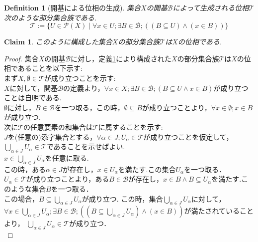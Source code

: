 \documentclass[dvipdfmx]{jbook}
\newtheorem{definition}{Definition}[section]
\newtheorem{claim}{Claim}[section]
\theoremstyle{remark}
\theoremstyle{plain}
\begin{document}
\begin{definition}[開基による位相の生成]\label{1}
	集合$X$の開基$\mathcal{B}$によって生成される位相$\mathcal{T}$次のような部分集合族である.
	$$
	\mathcal{T} := \{ U \in \mathcal{P}(X) \mid \forall x \in U ; \exists B \in \mathcal{B} ; \left( \left( B  \subseteq U \right) \land \left(x \in B \right) \right) \}
	$$
\end{definition}

\begin{claim}
	このように構成した集合$X$の部分集合族$\mathcal{T}$は$X$の位相である.
\end{claim}

\begin{proof}
	集合$X$の開基$\mathcal{B}$に対し，定義\ref{1}により構成された$X$の部分集合族$\mathcal{T}$は$X$の位相であることを以下示す:\\
	まず$X, \emptyset \in \mathcal{T} $が成り立つことを示す:\\
	$ X$に対して，開基$\mathcal{B}$の定義より，$\forall x \in X  ; \exists B \in \mathcal{B} ; \left( B  \subseteq U \land x \in B \right)$が成り立つことは自明である.\\
	$\emptyset $に対し，$B  \in \mathcal{B}$を一つ取る，この時，$ \emptyset \subseteq B$が成り立つことより，$\forall x \in \emptyset; x \in B$が成り立つ.\\
	次に$\mathcal{T}$の任意要素の和集合は$\mathcal{T}$に属することを示す:\\
	$J$を(任意の)添字集合とする，$\forall \alpha \in J; U_{\alpha} \in \mathcal{T}$が成り立つことを仮定して，$\bigcup\limits_{\alpha \in J} U_{\alpha } \in \mathcal{T}$であることを示せばよい.\\
	$x \in \bigcup\limits_{\alpha \in J} U_{\alpha }$を任意に取る.\\
	この時，ある$\alpha \in J$が存在し，$x \in U_{\alpha}$を満たす.この集合$U_{\alpha}$を一つ取る．\\
	$U_{\alpha } \in \mathcal{T}$が成り立つことより，ある$B \in \mathcal{B}$が存在し，$x \in B \land B \subseteq U_{\alpha}$を満たす.このような集合$B$を一つ取る．\\
	この場合，$B \subseteq \bigcup\limits_{\alpha \in J} U_{\alpha } $が成り立つ.
	この時，集合$\bigcup\limits_{\alpha \in J} U_{\alpha } $に対して，$\forall x \in \bigcup\limits_{\alpha \in J} U_{\alpha } ; \exists B \in \mathcal{B} ; \left( \left( B  \subseteq \bigcup\limits_{\alpha \in J} U_{\alpha } \right)  \land \left( x \in B \right) \right) $が満たされていることより，
	$\bigcup\limits_{\alpha \in J} U_{\alpha } \in \mathcal{T}$が成り立つ．\\

\end{proof}
\end{document}

